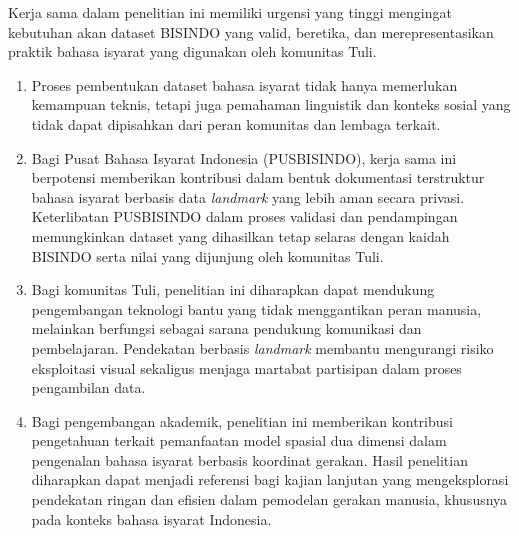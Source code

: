 Kerja sama dalam penelitian ini memiliki urgensi yang tinggi mengingat kebutuhan akan dataset BISINDO yang valid, beretika, dan merepresentasikan praktik bahasa isyarat yang digunakan oleh komunitas Tuli.
\begin{enumerate}[noitemsep]
    \item Proses pembentukan dataset bahasa isyarat tidak hanya memerlukan kemampuan teknis, tetapi juga pemahaman linguistik dan konteks sosial yang tidak dapat dipisahkan dari peran komunitas dan lembaga terkait.
    \item Bagi Pusat Bahasa Isyarat Indonesia (PUSBISINDO), kerja sama ini berpotensi memberikan kontribusi dalam bentuk dokumentasi terstruktur bahasa isyarat berbasis data \textit{landmark} yang lebih aman secara privasi. Keterlibatan PUSBISINDO dalam proses validasi dan pendampingan memungkinkan dataset yang dihasilkan tetap selaras dengan kaidah BISINDO serta nilai yang dijunjung oleh komunitas Tuli.
    \item Bagi komunitas Tuli, penelitian ini diharapkan dapat mendukung pengembangan teknologi bantu yang tidak menggantikan peran manusia, melainkan berfungsi sebagai sarana pendukung komunikasi dan pembelajaran. Pendekatan berbasis \textit{landmark} membantu mengurangi risiko eksploitasi visual sekaligus menjaga martabat partisipan dalam proses pengambilan data.
    \item Bagi pengembangan akademik, penelitian ini memberikan kontribusi pengetahuan terkait pemanfaatan model spasial dua dimensi dalam pengenalan bahasa isyarat berbasis koordinat gerakan. Hasil penelitian diharapkan dapat menjadi referensi bagi kajian lanjutan yang mengeksplorasi pendekatan ringan dan efisien dalam pemodelan gerakan manusia, khususnya pada konteks bahasa isyarat Indonesia.
\end{enumerate}
